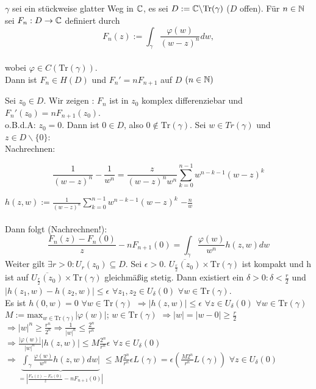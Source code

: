 \documentclass[a4paper,twoside,DIV15,BCOR12mm]{scrbook}
\def\Tr{\text{Tr}}
\begin{document}
\begin{satz}
$\gamma$ sei ein stückweise glatter Weg in $\mathbb{C}$, es sei $D:= \MdC \backslash
\Tr(\gamma)$ ($D$ offen). Für $n \in \mathbb{N}$ sei $F_n: D \to \mathbb{C}$ definiert durch
\[ F_n(z) := \int_{\gamma} \frac{\varphi(w)}{(w-z)^n} dw,\]\\ 
wobei $\varphi \in C(\Tr(\gamma))$. \\
Dann ist $F_n \in H(D)$ und $F_n ' = n F_{n+1}$ auf $D$ $(n\in \mathbb{N})$
\end{satz}

\begin{beweis}
Sei $z_0 \in D.$ Wir zeigen : $F_n$ ist in $z_0$ komplex differenziebar und $F_n'(z_0) =
nF_{n+1}(z_0)$. \\
o.B.d.A: $z_0 = 0$. Dann ist $ 0 \in D$, also $0 \not\in \Tr(\gamma)$. 
Sei $w \in Tr(\gamma)$ und $z \in D \backslash \{0\} $: \\ 
Nachrechnen: 

\[ \frac{1}{(w-z)^n}-\frac{1}{w^n} = \frac{z}{(w-z)^n w^n} 
\sum_{k=0}^{n-1}w^{n-k-1}(w-z)^k \]

$h(z,w) := \frac{1}{(w-z)^n} \sum_{k=0}^{n-1}w^{n-k-1}(w-z)^k$  $-\frac{n}{w}$
\\ \\ Dann folgt (Nachrechnen!): \[ \frac{F_n(z)-F_n(0)}{z}- n F_{n+1}(0) =
\int_{\gamma} \frac{\varphi(w)}{w^n} h(z,w) dw\] 
Weiter gilt $\exists r > 0 : U_r(z_0) \subseteq D$. Sei $\epsilon > 0$.
$\overline{U_{\frac{r}{2}}(z_0)} \times \Tr(\gamma)$ ist kompakt und h ist auf 
$\overline{U_{\frac{r}{2}}(z_0)} \times \Tr(\gamma)$ gleichmäßig stetig.
Dann existiert ein $\delta >0: \delta < \frac{r}{2}$ und $|h(z_1,w) - h(z_2,w)|
\leq \epsilon$ $\forall z_1, z_2 \in U_{\delta}(0)$ $\forall w \in \Tr(\gamma)$.
\\ Es ist $h(0,w) = 0$ $\forall w \in \Tr(\gamma)$ $\Rightarrow |h(z, w)| \leq
\epsilon $ $\forall z \in U_{\delta}(0)$ $ \forall w \in \Tr(\gamma)$ \\
$M := \text{max}_{w \in \Tr(\gamma)}|\varphi(w)|$; $w \in \Tr(\gamma)$ $\Rightarrow |w| =
|w-0| \geq \frac{r}{2}$ \\ $\Rightarrow |w|^n \geq \frac{r^n}{2^n} \Rightarrow
\frac{1}{|w|^n} \leq \frac{2^n}{r^n}$ \\
$\Rightarrow \frac{| \varphi(w) |}{|w|^n }|h(z,w)|  \leq M \frac{2^n}{r^n} \epsilon$ $\forall z \in U_{\delta}(0)$ \\
$\Rightarrow  \underbrace{\int_{\gamma} \frac{ \varphi(w) }{w^n }h(z,w)dw|}_{= 
|\frac{F_n(z)-F_n(0)}{z}- n F_{n+1}(0)|} \leq  M
\frac{2^n}{r^n} \epsilon L(\gamma) = \epsilon (\frac{M 2^n}{r^n} L(\gamma))$ 
$\forall z \in U_{\delta}(0)$
\end{beweis}
\end{document}
